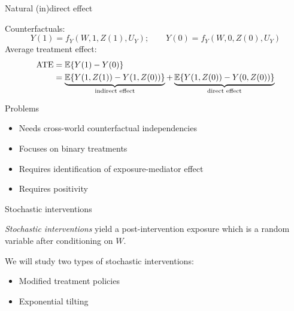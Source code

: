 \documentclass{beamer}
\begin{document}

\begin{frame}{Natural (in)direct effect}

Counterfactuals:
  \[Y(1) = f_Y(W, 1, Z(1), U_Y);\quad\quad Y(0) = f_Y(W, 0, Z(0),
    U_Y)\]
Average treatment effect:
  \begin{align*}
   \text{ATE}  &= \mathbb{E}\{Y(1) - Y(0)\}\\
                 &=\underbrace{\mathbb{E}\{Y(1, Z(1)) -
                   Y(1, Z(0))\}}_{\text{indirect effect}} +
                   \underbrace{\mathbb{E}\{Y(1, Z(0)) -
                   Y(0, Z(0))\}}_{\text{direct effect}}
  \end{align*}
  \begin{block}{Problems}
    \begin{itemize}
      \item Needs cross-world counterfactual independencies
      \item Focuses on binary treatments
      \item Requires identification of exposure-mediator effect
      \item Requires positivity
    \end{itemize}
  \end{block}

\note{
}

\end{frame}


\begin{frame}{Stochastic interventions}
  \begin{definition}
    \textit{Stochastic interventions} yield a post-intervention exposure
    which is a random variable after conditioning on $W$.
  \end{definition}

\vspace{2mm}

  We will study two types of stochastic interventions:
  \begin{itemize}
    \item Modified treatment policies
    \item Exponential tilting
  \end{itemize}

\note{
}

\end{frame}
\end{document}
